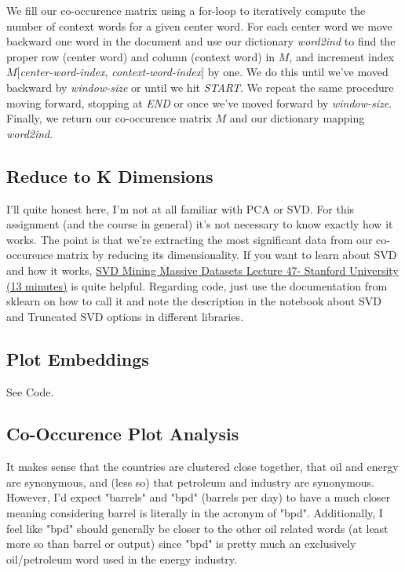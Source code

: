 \documentclass[12pt]{article}
\begin{document}
We fill our co-occurence matrix using a for-loop to iteratively compute the number of context words
for a given center word. For each center word we move backward one word in the document and use our dictionary 
\emph{word2ind} to find the proper row (center word) and column (context word) in $M$, and increment index
$M$[\emph{center-word-index}, \emph{context-word-index}] by one. We do this until we've moved backward 
by \emph{window-size} or until we hit \emph{START}. We repeat the same procedure moving forward,
stopping at \emph{END} or once we've moved forward by \emph{window-size}. 
Finally, we return our co-occurence matrix $M$ and our dictionary mapping \emph{word2ind}. 

\subsection{Reduce to K Dimensions}
I'll quite honest here, I'm not at all familiar with PCA or SVD. For this assignment (and the 
course in general) it's not necessary to know exactly how it works. The point is that we're extracting 
the most significant data from our 
co-occurence matrix by reducing its dimensionality. If you want to learn about SVD and 
how it works, \href{https://www.youtube.com/watch?v=P5mlg91as1c}
{SVD Mining Massive Datasets Lecture 47- Stanford University (13 minutes)} is quite helpful. 
Regarding code, just use the documentation from sklearn
on how to call it and note the description in the notebook about SVD and Truncated SVD options in different libraries. 

\subsection{Plot Embeddings}
See Code.

\subsection{Co-Occurence Plot Analysis}
It makes sense that the countries are clustered close 
together, that oil and energy are synonymous, and (less so) that petroleum and industry are synonymous. 
However, I'd expect "barrels" and "bpd" (barrels per day) to have a much closer meaning considering
barrel is literally in the acronym of "bpd". Additionally, I feel like "bpd" should generally be 
closer to the other oil related words (at least more so than barrel or output) 
since "bpd" is pretty much an exclusively oil/petroleum word used in the energy industry. 
\end{document}
